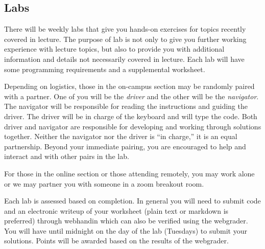 \documentclass[12pt]{scrartcl}
\begin{document}
%

\subsection{Labs}

There will be weekly labs that give you hands-on exercises for 
topics recently covered in lecture.  The purpose of lab is not 
only to give you further working experience with lecture topics, 
but also to provide you with additional information and details 
not necessarily covered in lecture.  Each lab will have some 
programming requirements and a supplemental worksheet.  

Depending on logistics, those in the on-campus section may be
randomly paired with a partner.  One of you will 
be the \emph{driver} and the other will be the \emph{navigator}.  
The navigator will be responsible for reading the instructions 
and guiding the driver.  The driver will be in charge of the 
keyboard and will type the code.  Both driver and navigator are 
responsible for developing and working through solutions together.
Neither the navigator nor the driver is ``in charge,'' it is an 
equal partnership.  Beyond your immediate pairing, you are 
encouraged to help and interact and with other pairs in the lab.

For those in the online section or those attending remotely, you 
may work alone or we may partner you with someone in a zoom 
breakout room.  

Each lab is assessed based on completion.  In general you will
need to submit code and an electronic writeup of your worksheet
(plain text or markdown is preferred) through webhandin which
can also be verified using the webgrader.  You will have until
midnight on the day of the lab (Tuesdays) to submit your solutions.
Points will be awarded based on the results of the webgrader.
\end{document}
